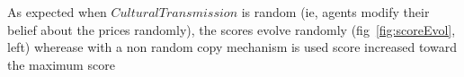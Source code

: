 \documentclass[a0paper,landscape,showframe]{baposter}
\begin{document}
\begin{poster}
{\begin{multicols}{2}
As expected when $CulturalTransmission$ is random (ie, agents modify their belief about the prices randomly), the scores evolve randomly (fig~\ref{fig:scoreEvol}, left) wherease with a non random copy mechanism is used score increased toward the maximum score 

%
%
\vfil
\columnbreak

\end{multicols}}
\end{poster}
\end{document}
